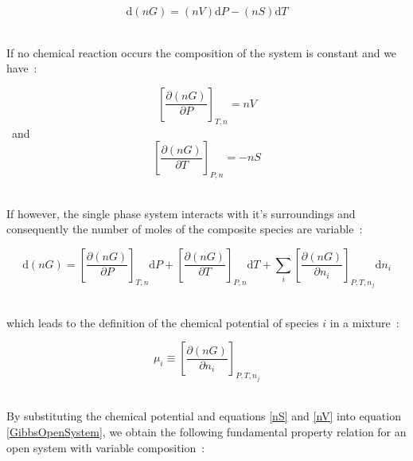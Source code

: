 \begin{equation}
\mathrm{d}\left(nG\right) = \left(nV\right) \mathrm{d}P - \left(nS\right) \mathrm{d}T \label{GibbsClosedSystem}
\end{equation}\


If no chemical reaction occurs the composition of the system is constant and we have~\cite{SmithNessAbbott}:\

\begin{equation}
\left[\frac{\partial \left(nG\right)}{\partial P}\right]_{T, n}  = nV \label{nV}
\end{equation}\
and 
\begin{equation}
\left[\frac{\partial \left(nG\right)}{\partial T}\right]_{P, n}  = -nS \label{nS}
\end{equation}\

If however, the single phase system interacts with it's surroundings and consequently the number of moles of the composite species are variable~\cite{SmithNessAbbott}:\

\begin{equation}
\mathrm{d}\left(nG\right) = \left[\frac{\partial \left(nG\right)}{\partial P}\right]_{T, n}\mathrm{d}P + \left[\frac{\partial \left(nG\right)}{\partial T}\right]_{P, n}\mathrm{d}T + \sum_{i}\left[\frac{\partial \left(nG\right)}{\partial n_{i}}\right]_{P, T, n_{j}}\mathrm{d} n_{i} \label{GibbsOpenSystem}
\end{equation}\

which leads to the definition of the chemical potential of species $i$ in a mixture~\cite{SmithNessAbbott, MolecularThermodynamicsOfFluidPhaseEquilibria}:\

\begin{equation}
\mu_{i} \equiv \left[\frac{\partial \left(nG\right)}{\partial n_{i}}\right]_{P, T, n_{j}} \label{ChemicalPotential}
\end{equation}\


By substituting the chemical potential and equations \ref{nS} and \ref{nV} into equation \ref{GibbsOpenSystem}, we obtain the following fundamental property relation for an open system with variable composition~\cite{SmithNessAbbott}:\

